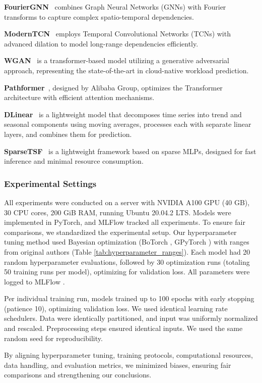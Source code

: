 \documentclass{ieeetmlcn}
\begin{document}
\begin{itemize}
    \item \textbf{FourierGNN}~\cite{yi2024fouriergnn} combines Graph Neural Networks (GNNs) with Fourier transforms to capture complex spatio-temporal dependencies.
    \item \textbf{ModernTCN}~\cite{donghao2024moderntcn} employs Temporal Convolutional Networks (TCNs) with advanced dilation to model long-range dependencies efficiently.
    \item \textbf{WGAN}~\cite{arbat2022wassersteinadversarialtransformercloud} is a transformer-based model utilizing a generative adversarial approach, representing the state-of-the-art in cloud-native workload prediction.
    \item \textbf{Pathformer}~\cite{pathformer2024}, designed by Alibaba Group, optimizes the Transformer architecture with efficient attention mechanisms.
    {\color{blue}
    \item \textbf{DLinear}~\cite{DLinear} is a lightweight model that decomposes time series into trend and seasonal components using moving averages, processes each with separate linear layers, and combines them for prediction.}
    \item \textbf{SparseTSF}~\cite{sparseTSF} is a lightweight framework based on sparse MLPs, designed for fast inference and minimal resource consumption.
\end{itemize}

\subsubsection{Experimental Settings}

{\color{blue}
All experiments were conducted on a server with NVIDIA A100 GPU (40 GB), 30 CPU cores, 200 GiB RAM, running Ubuntu 20.04.2 LTS. Models were implemented in PyTorch, and MLFlow tracked all experiments. To ensure fair comparisons, we standardized the experimental setup. Our hyperparameter tuning method used Bayesian optimization (BoTorch \cite{balandat2020botorch}, GPyTorch \cite{gardner2018gpytorch}) with ranges from original authors (Table \ref{tab:hyperparameter_ranges}). Each model had 20 random hyperparameter evaluations, followed by 30 optimization runs (totaling 50 training runs per model), optimizing for validation loss. All parameters were logged to MLFlow \cite{MLFlow}.

Per individual training run, models trained up to 100 epochs with early stopping (patience 10), optimizing validation loss. We used identical learning rate schedulers. Data were identically partitioned, and input was uniformly normalized and rescaled. Preprocessing steps ensured identical inputs. We used the same random seed for reproducibility.

By aligning hyperparameter tuning, training protocols, computational resources, data handling, and evaluation metrics, we minimized biases, ensuring fair comparisons and strengthening our conclusions.
}
\end{document}
